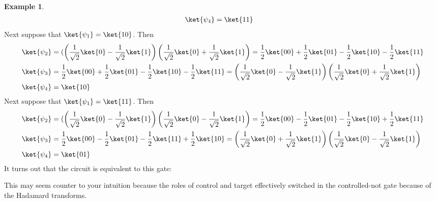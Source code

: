 \documentclass[12pt, oneside]{book}
\theoremstyle{definition}
\theoremstyle{definition}
\newtheorem{example}{Example}[section]
\theoremstyle{remark}
\begin{document}
\begin{example}
\begin{align*}
    \ket{\psi_4}&=\ket{11}
    \end{align*}
    Next suppose that $\ket{\psi_1}=\ket{10}$. Then
    \begin{align*}
    \ket{\psi_2}&=(\left(\frac{1}{\sqrt{2}}\ket{0}-\frac{1}{\sqrt{2}}\ket{1}\right)\left(\frac{1}{\sqrt{2}}\ket{0}+\frac{1}{\sqrt{2}}\ket{1}\right)=\frac{1}{2}\ket{00}+\frac{1}{2}\ket{01}-\frac{1}{2}\ket{10}-\frac{1}{2}\ket{11}\\
    \ket{\psi_3}&=\frac{1}{2}\ket{00}+\frac{1}{2}\ket{01}-\frac{1}{2}\ket{10}-\frac{1}{2}\ket{11}=\left(\frac{1}{\sqrt{2}}\ket{0}-\frac{1}{\sqrt{2}}\ket{1}\right)\left(\frac{1}{\sqrt{2}}\ket{0}+\frac{1}{\sqrt{2}}\ket{1}\right)\\
    \ket{\psi_4}&=\ket{10}
    \end{align*}
    Next suppose that $\ket{\psi_1}=\ket{11}$. Then
    \begin{align*}
    \ket{\psi_2}&=(\left(\frac{1}{\sqrt{2}}\ket{0}-\frac{1}{\sqrt{2}}\ket{1}\right)\left(\frac{1}{\sqrt{2}}\ket{0}-\frac{1}{\sqrt{2}}\ket{1}\right)=\frac{1}{2}\ket{00}-\frac{1}{2}\ket{01}-\frac{1}{2}\ket{10}+\frac{1}{2}\ket{11}\\
    \ket{\psi_3}&=\frac{1}{2}\ket{00}-\frac{1}{2}\ket{01}-\frac{1}{2}\ket{11}+\frac{1}{2}\ket{10}=\left(\frac{1}{\sqrt{2}}\ket{0}+\frac{1}{\sqrt{2}}\ket{1}\right)\left(\frac{1}{\sqrt{2}}\ket{0}-\frac{1}{\sqrt{2}}\ket{1}\right)\\
    \ket{\psi_4}&=\ket{01}
    \end{align*}
    It turns out that the circuit is equivalent to this gate:

    This may seem counter to your intuition because the roles of control and target effectively switched in the controlled-not gate because of the Hadamard transforms.
\end{example}
\end{document}
